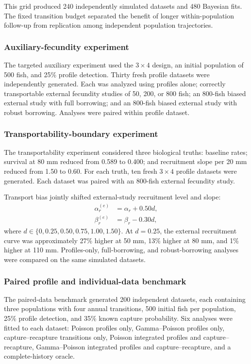 \documentclass[11pt]{article}
\begin{document}
This grid produced 240 independently simulated datasets and 480 Bayesian
fits. The fixed transition budget separated the benefit of longer
within-population follow-up from replication among independent population
trajectories.

\subsubsection{Auxiliary-fecundity experiment}

The targeted auxiliary experiment used the \(3\times4\) design, an initial
population of 500 fish, and 25\% profile detection. Thirty fresh profile
datasets were independently generated. Each was analyzed using profiles
alone; correctly transportable external fecundity studies of 50, 200, or 800
fish; an 800-fish biased external study with full borrowing; and an 800-fish
biased external study with robust borrowing. Analyses were paired within
profile dataset.

\subsubsection{Transportability-boundary experiment}

The transportability experiment considered three biological truths: baseline
rates; survival at 80 mm reduced from 0.589 to 0.400; and recruitment slope per
20 mm reduced from 1.50 to 0.60. For each truth, ten fresh \(3\times4\)
profile datasets were generated. Each dataset was paired with an 800-fish
external fecundity study.

Transport bias jointly shifted external-study recruitment level and slope:
\begin{align}
  \alpha_r^{(e)} &= \alpha_r + 0.50d,\\
  \beta_r^{(e)} &= \beta_r - 0.30d,
\end{align}
where \(d\in\{0,0.25,0.50,0.75,1.00,1.50\}\). At \(d=0.25\), the external
recruitment curve was approximately 27\% higher at 50 mm, 13\% higher at
80 mm, and 1\% higher at 110 mm. Profiles-only, full-borrowing, and
robust-borrowing analyses were compared on the same simulated datasets.

\subsubsection{Paired profile and individual-data benchmark}

The paired-data benchmark generated 200 independent datasets, each containing
three populations with four annual transitions, 500 initial fish per
population, 25\% profile detection, and 35\% known capture probability. Six
analyses were fitted to each dataset: Poisson profiles only, Gamma--Poisson
profiles only, capture--recapture transitions only, Poisson integrated
profiles and capture--recapture, Gamma--Poisson integrated profiles and
capture--recapture, and a complete-history oracle.
\end{document}
